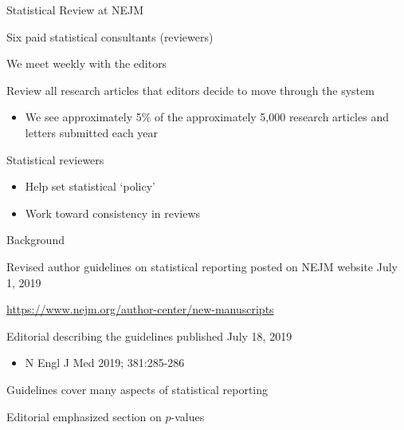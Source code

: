 \documentclass[ignorenonframetext,]{beamer}
\providecommand{\tightlist}{%
  \setlength{\itemsep}{0pt}\setlength{\parskip}{0pt}}
\begin{document}
\begin{frame}{Statistical Review at NEJM}
\protect\hypertarget{statistical-review-at-nejm}{}

Six paid statistical consultants (reviewers)

We meet weekly with the editors

Review all research articles that editors decide to move through the
system

\begin{itemize}
\tightlist
\item
  We see approximately 5\% of the approximately 5,000 research articles
  and letters submitted each year
\end{itemize}

Statistical reviewers

\begin{itemize}
\item
  Help set statistical `policy'
\item
  Work toward consistency in reviews
\end{itemize}

\end{frame}

\begin{frame}{Background}
\protect\hypertarget{background}{}

Revised author guidelines on statistical reporting posted on NEJM
website July 1, 2019

\url{https://www.nejm.org/author-center/new-manuscripts}

Editorial describing the guidelines published July 18, 2019

\begin{itemize}
\tightlist
\item
  N Engl J Med 2019; 381:285-286
\end{itemize}

Guidelines cover many aspects of statistical reporting

Editorial emphasized section on \(p\)-values

\end{frame}
\end{document}
